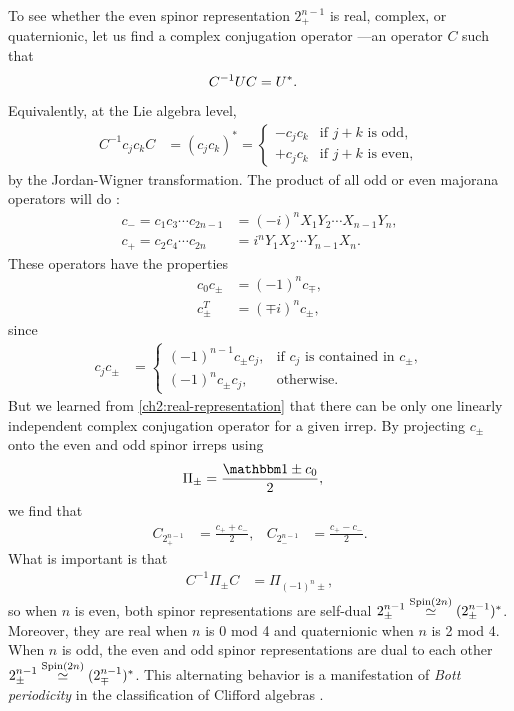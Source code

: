 To see whether the even spinor representation $2^{n-1}_+$ is real, complex, or quaternionic, let us find a complex conjugation operator ---an operator $C$ such that
\begin{align}
	C^{-1}U C &= U^*.
\end{align}
Equivalently, at the Lie algebra level,
\begin{align}
	C^{-1} c_jc_k C &= (c_jc_k)^* = \begin{cases}
		-c_jc_k & \text{if $j+k$ is odd}, \\
		+c_jc_k & \text{if $j+k$ is even},
	\end{cases}
\end{align}
by the Jordan-Wigner transformation.
The product of all odd or even majorana operators will do \cite{zee2016group}:
\begin{align}
	c_- = c_1c_3\cdots c_{2n-1} &= (-i)^n X_1 Y_2 \cdots X_{n-1} Y_{n}, \\
	c_+ = c_2c_4\cdots c_{2n} &= i^n Y_1  X_2 \cdots Y_{n-1} X_{n}.
\end{align}
These operators have the properties
\begin{align}
	c_0 c_{\pm} &= (-1)^n c_{\mp}, \\
	c_{\pm}^T &= (\mp i)^n c_{\pm},
\end{align}
since
\begin{align}
	c_j c_{\pm} &=
	\begin{cases}
		(-1)^{n-1} c_{\pm} c_j, & \text{if $c_j$ is contained in $c_{\pm}$}, \\
		(-1)^{n} c_{\pm} c_j, & \text{otherwise}.
	\end{cases}
\end{align}
But we learned from \autoref{ch2:real-representation} that there can be only one linearly independent complex conjugation operator for a given irrep. By projecting $c_{\pm}$ onto the even and odd spinor irreps using
\begin{align}
	\Pi_{\pm} &= \frac{\id \pm c_0}{2},
\end{align}
we find that
\begin{align}
	C_{2^{n-1}_+} &= \frac{c_+ + c_-}{2}, & C_{2^{n-1}_-} &= \frac{c_+ - c_-}{2}.
\end{align}
What is important is that
\begin{align}
	C^{-1} \Pi_{\pm} C &= \Pi_{(-1)^n \pm},
\end{align}
so when $n$ is even, both spinor representations are self-dual $2^{n-1}_{\pm} \stackrel{\text{Spin}(2n)}{\simeq} (2^{n-1}_{\pm})^*$. Moreover, they are real when $n$ is 0 mod 4 and quaternionic when $n$ is 2 mod 4. When $n$ is odd, the even and odd spinor representations are dual to each other $2^{n-1}_{\pm} \stackrel{\text{Spin}(2n)}{\simeq} (2^{n-1}_{\mp})^*$. This alternating behavior is a manifestation of \emph{Bott periodicity} in the classification of Clifford algebras \cite{atiyah1964clifford}.

